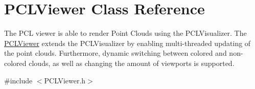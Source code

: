 \hypertarget{class_p_c_l_viewer}{}\section{P\+C\+L\+Viewer Class Reference}
\label{class_p_c_l_viewer}


The P\+C\+L viewer is able to render Point Clouds using the P\+C\+L\+Visualizer. The \hyperlink{class_p_c_l_viewer}{P\+C\+L\+Viewer} extends the P\+C\+L\+Visualizer by enabling multi-\/threaded updating of the point clouds. Furthermore, dynamic switching between colored and non-\/colored clouds, as well as changing the amount of viewports is supported.  




{\ttfamily \#include $<$P\+C\+L\+Viewer.\+h$>$}

